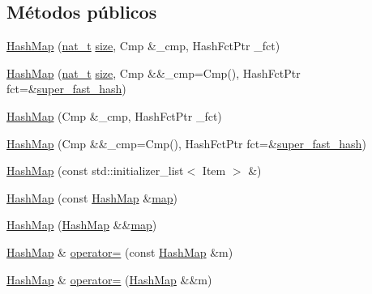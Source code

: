 \subsection*{Métodos públicos}
\begin{DoxyCompactItemize}
\item 
\hyperlink{class_designar_1_1_hash_map_a39b8b365b9399ca72142f522d8d4e877}{Hash\+Map} (\hyperlink{namespace_designar_aa72662848b9f4815e7bf31a7cf3e33d1}{nat\+\_\+t} \hyperlink{class_designar_1_1_hash_set_a0026e1b2caf94d25b554cd6a399f691f}{size}, Cmp \&\+\_\+cmp, Hash\+Fct\+Ptr \+\_\+fct)
\item 
\hyperlink{class_designar_1_1_hash_map_aa82cf8d63637401365bebe4dafe556e2}{Hash\+Map} (\hyperlink{namespace_designar_aa72662848b9f4815e7bf31a7cf3e33d1}{nat\+\_\+t} \hyperlink{class_designar_1_1_hash_set_a0026e1b2caf94d25b554cd6a399f691f}{size}, Cmp \&\&\+\_\+cmp=Cmp(), Hash\+Fct\+Ptr fct=\&\hyperlink{namespace_designar_afd5712d16b3ae1c1c7d59f1004cd96fd}{super\+\_\+fast\+\_\+hash})
\item 
\hyperlink{class_designar_1_1_hash_map_ad1b22ee9f50a5be7febcf622ae8cb31a}{Hash\+Map} (Cmp \&\+\_\+cmp, Hash\+Fct\+Ptr \+\_\+fct)
\item 
\hyperlink{class_designar_1_1_hash_map_ad310e763bce2806e390fde121efe92c6}{Hash\+Map} (Cmp \&\&\+\_\+cmp=Cmp(), Hash\+Fct\+Ptr fct=\&\hyperlink{namespace_designar_afd5712d16b3ae1c1c7d59f1004cd96fd}{super\+\_\+fast\+\_\+hash})
\item 
\hyperlink{class_designar_1_1_hash_map_a3a00fde1b9022f78eabcb90eef446566}{Hash\+Map} (const std\+::initializer\+\_\+list$<$ Item $>$ \&)
\item 
\hyperlink{class_designar_1_1_hash_map_aa59dbb80b0a3d62cde145a84e76bd1bb}{Hash\+Map} (const \hyperlink{class_designar_1_1_hash_map}{Hash\+Map} \&\hyperlink{class_designar_1_1_container_algorithms_a3b9044a197e4ceec6a1de03de197a293}{map})
\item 
\hyperlink{class_designar_1_1_hash_map_a16d4d99bb19bd91ea5700d46d188684b}{Hash\+Map} (\hyperlink{class_designar_1_1_hash_map}{Hash\+Map} \&\&\hyperlink{class_designar_1_1_container_algorithms_a3b9044a197e4ceec6a1de03de197a293}{map})
\item 
\hyperlink{class_designar_1_1_hash_map}{Hash\+Map} \& \hyperlink{class_designar_1_1_hash_map_afaf1bd72c38d70492007bdfd71ae94af}{operator=} (const \hyperlink{class_designar_1_1_hash_map}{Hash\+Map} \&m)
\item 
\hyperlink{class_designar_1_1_hash_map}{Hash\+Map} \& \hyperlink{class_designar_1_1_hash_map_afb0dfc4b02391d050767dc730a73f3c5}{operator=} (\hyperlink{class_designar_1_1_hash_map}{Hash\+Map} \&\&m)

\end{DoxyCompactItemize}
